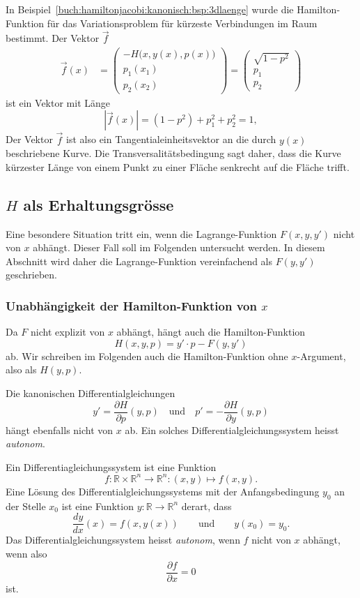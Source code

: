 \begin{beispiel}
In Beispiel~\ref{buch:hamiltonjacobi:kanonisch:bsp:3dlaenge} wurde
die Hamilton-Funktion für das Variationsproblem für kürzeste Verbindungen
im Raum bestimmt.
Der Vektor $\vec{f}$ 
\begin{align*}
\vec{f}(x)
&=
\begin{pmatrix}
-H\bigl(x,y(x),p(x)\bigr)\\
p_1(x_1)\\
p_2(x_2)
\end{pmatrix}
=
\begin{pmatrix}
\sqrt{1-p^2}\\
p_1\\
p_2
\end{pmatrix}
\end{align*}
ist ein Vektor mit Länge
\[
|\vec{f}(x)|
=
(1-p^2) + p_1^2+p_2^2
=
1,
\]
Der Vektor $\vec{f}$ ist also ein Tangentialeinheitsvektor an die
durch $y(x)$ beschriebene Kurve.
Die Transversalitätsbedingung sagt daher, dass die Kurve kürzester
Länge von einem Punkt zu einer Fläche senkrecht auf die Fläche trifft.
\end{beispiel}

%
%
\subsection{$H$ als Erhaltungsgrösse}
Eine besondere Situation tritt ein, wenn die Lagrange-Funktion $F(x,y,y')$
nicht von $x$ abhängt.
Dieser Fall soll im Folgenden untersucht werden.
In diesem Abschnitt wird daher die
Lagrange-Funktion vereinfachend als $F(y,y')$ geschrieben.

%
%
\subsubsection{Unabhängigkeit der Hamilton-Funktion von $x$}
Da $F$ nicht explizit von $x$ abhängt, hängt auch die
Hamilton-Funktion
\[
H(x,y,p)
=
y'\cdot p - F(y,y')
\]
ab.
Wir schreiben im Folgenden auch die Hamilton-Funktion ohne $x$-Argument,
also als $H(y,p)$.

Die kanonischen Differentialgleichungen
\[
y' = \frac{\partial H}{\partial p}(y,p)
\quad\text{und}\quad
p' = -\frac{\partial H}{\partial y}(y,p)
\]
hängt ebenfalls nicht von $x$ ab.
Ein solches Differentialgleichungssystem heisst {\em autonom}.

\begin{definition}
Ein Differentiagleichungssystem ist eine Funktion 
\[
f\colon \mathbb{R}\times \mathbb{R}^n\to\mathbb{R}^n
:
(x,y)\mapsto f(x,y).
\]
Eine Lösung des Differentialgleichungssystems mit der Anfangsbedingung
$y_0$ an der Stelle $x_0$ ist eine Funktion
$y\colon\mathbb{R}\to\mathbb{R}^n$ derart, dass 
\[
\frac{dy}{dx}(x)
=
f(x,y(x))
\qquad\text{und}\qquad
y(x_0)=y_0.
\]
Das Differentialgleichungssystem heisst {\em autonom}, wenn $f$ nicht von
%
$x$ abhängt, wenn also
\[
\frac{\partial f}{\partial x} = 0
\]
ist.
\end{definition}

